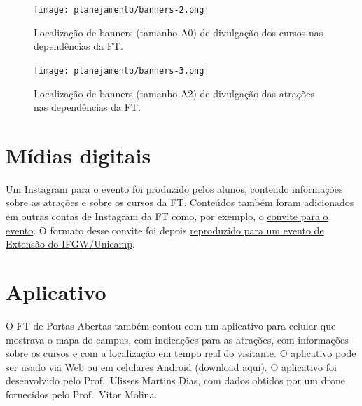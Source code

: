 \documentclass[
  letterpaper,
  DIV=11,
  numbers=noendperiod]{scrreprt}
\begin{document}
\begin{figure}[H]

{\centering \texttt{[image: planejamento/banners-2.png]}

}

\caption{Localização de banners (tamanho A0) de divulgação dos cursos
nas dependências da FT.}

\end{figure}%

\begin{figure}[H]

{\centering \texttt{[image: planejamento/banners-3.png]}

}

\caption{Localização de banners (tamanho A2) de divulgação das atrações
nas dependências da FT.}

\end{figure}%

\section{Mídias digitais}\label{muxeddias-digitais}

Um \href{https://www.instagram.com/ftportasabertas/}{Instagram} para o
evento foi produzido pelos alunos, contendo informações sobre as
atrações e sobre os cursos da FT. Conteúdos também foram adicionados em
outras contas de Instagram da FT como, por exemplo, o
\href{https://www.instagram.com/reel/DKZt6T_xspD/}{convite para o
evento}. O formato desse convite foi depois
\href{https://www.instagram.com/p/DKk4qxtSHpM/?hl=pt}{reproduzido para
um evento de Extensão do IFGW/Unicamp}.

\section{Aplicativo}\label{aplicativo}

O FT de Portas Abertas também contou com um aplicativo para celular que
mostrava o mapa do campus, com indicações para as atrações, com
informações sobre os cursos e com a localização em tempo real do
visitante. O aplicativo pode ser usado via
\href{https://diversos-af313.web.app/ftpa/}{Web} ou em celulares Android
(\href{http://wordpress.ft.unicamp.br/ftpa/wp-content/uploads/sites/92/2025/06/ftpa_map.apk}{download
aqui}). O aplicativo foi desenvolvido pelo Prof.~Ulisses Martins Dias,
com dados obtidos por um drone fornecidos pelo Prof.~Vitor Molina.
\end{document}
